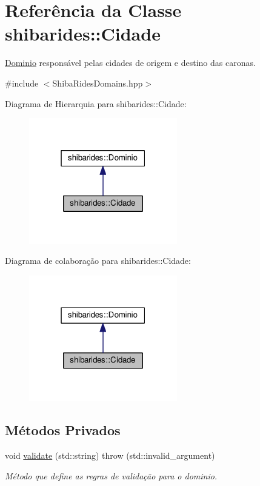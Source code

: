 \hypertarget{classshibarides_1_1Cidade}{}\section{Referência da Classe shibarides\+:\+:Cidade}
\label{classshibarides_1_1Cidade}


\hyperlink{classshibarides_1_1Dominio}{Dominio} responsável pelas cidades de origem e destino das caronas.  




{\ttfamily \#include $<$Shiba\+Rides\+Domains.\+hpp$>$}



Diagrama de Hierarquia para shibarides\+:\+:Cidade\+:\nopagebreak
\begin{figure}[H]
\begin{center}
\leavevmode
\includegraphics[width=183pt]{classshibarides_1_1Cidade__inherit__graph}
\end{center}
\end{figure}


Diagrama de colaboração para shibarides\+:\+:Cidade\+:\nopagebreak
\begin{figure}[H]
\begin{center}
\leavevmode
\includegraphics[width=183pt]{classshibarides_1_1Cidade__coll__graph}
\end{center}
\end{figure}
\subsection*{Métodos Privados}
\begin{DoxyCompactItemize}
\item 
void \hyperlink{classshibarides_1_1Cidade_a2a2455d16a0d316ebcc57c4389e1a0b0}{validate} (std\+::string)  throw (std\+::invalid\+\_\+argument)
\begin{DoxyCompactList}\small\item\em Método que define as regras de validação para o dominio. \end{DoxyCompactList}\end{DoxyCompactItemize}
